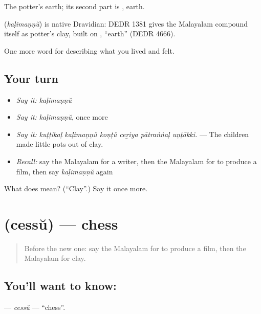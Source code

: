 The potter's earth; its second part is , earth.

\begin{cousinweb}
\textbf{} (\emph{kaḷimaṇṇŭ}) is native Dravidian: DEDR 1381 gives the Malayalam compound itself as potter's clay, built on , \textquotedblleft{}earth\textquotedblright{} (DEDR 4666).
\end{cousinweb}

\begin{grammarlens}[title={What you've built}]
One more word for describing what you lived and felt.
\end{grammarlens}

\subsection*{Your turn}
\begin{itemize}
\raggedright
  \item \emph{Say it:} \emph{kaḷimaṇṇŭ}
  \item \emph{Say it:} \emph{kaḷimaṇṇŭ}, once more
  \item \emph{Say it:} \emph{kuṭṭikaḷ kaḷimaṇṇŭ koṇṭŭ ceṟiya pātraṅṅaḷ uṇṭākki.} — The children made little pots out of clay.
  \item \emph{Recall:} say the Malayalam for a writer, then the Malayalam for to produce a film, then say \emph{kaḷimaṇṇŭ} again
\end{itemize}

\begin{tcolorbox}[breakable,colback=teal!4,colframe=teal!35!black,title={Before you move on}]
What does  mean? (\textquotedblleft{}Clay\textquotedblright{}.) Say it once more.
\end{tcolorbox}
\section[\texorpdfstring{\ml{ചെസ്സ്} (cessŭ)}{ചെസ്സ് (cessŭ)}]{ (cessŭ) — chess}

\label{lesson:ML-C566-cessu}



\begin{quote}
Before the new one: say the Malayalam for to produce a film, then the Malayalam for clay.
\end{quote}

\subsection*{You'll want to know: }
\textbf{} — \emph{cessŭ} — \textquotedblleft{}chess\textquotedblright{}.

